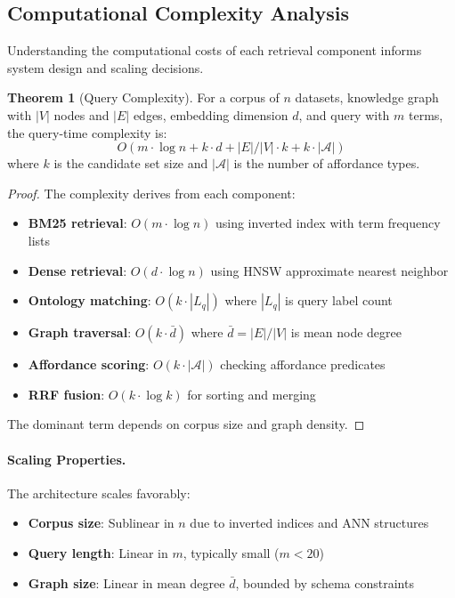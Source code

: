 \documentclass{article}
\theoremstyle{definition}
\newtheorem{theorem}{Theorem}[section]
\begin{document}
\subsection{Computational Complexity Analysis}

Understanding the computational costs of each retrieval component informs system design and scaling decisions.

\begin{theorem}[Query Complexity]
\label{thm:complexity}
For a corpus of $n$ datasets, knowledge graph with $|V|$ nodes and $|E|$ edges, embedding dimension $d$, and query with $m$ terms, the query-time complexity is:
\begin{equation}
O(m \cdot \log n + k \cdot d + |E|/|V| \cdot k + k \cdot |\mathcal{A}|)
\end{equation}
where $k$ is the candidate set size and $|\mathcal{A}|$ is the number of affordance types.
\end{theorem}

\begin{proof}
The complexity derives from each component:
\begin{itemize}
    \item \textbf{BM25 retrieval}: $O(m \cdot \log n)$ using inverted index with term frequency lists
    \item \textbf{Dense retrieval}: $O(d \cdot \log n)$ using HNSW approximate nearest neighbor
    \item \textbf{Ontology matching}: $O(k \cdot |L_q|)$ where $|L_q|$ is query label count
    \item \textbf{Graph traversal}: $O(k \cdot \bar{d})$ where $\bar{d} = |E|/|V|$ is mean node degree
    \item \textbf{Affordance scoring}: $O(k \cdot |\mathcal{A}|)$ checking affordance predicates
    \item \textbf{RRF fusion}: $O(k \cdot \log k)$ for sorting and merging
\end{itemize}
The dominant term depends on corpus size and graph density.
\end{proof}

\paragraph{Scaling Properties.} The architecture scales favorably:
\begin{itemize}
    \item \textbf{Corpus size}: Sublinear in $n$ due to inverted indices and ANN structures
    \item \textbf{Query length}: Linear in $m$, typically small ($m < 20$)
    \item \textbf{Graph size}: Linear in mean degree $\bar{d}$, bounded by schema constraints
\end{itemize}
\end{document}
